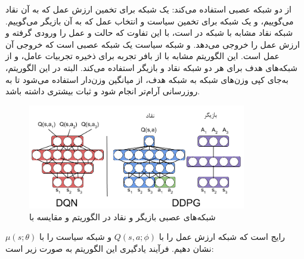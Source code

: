 از دو شبکه عصبی استفاده می‌کند: یک شبکه برای تخمین ارزش عمل که به آن نقاد می‌گوییم، و یک شبکه برای تخمین سیاست و انتخاب عمل که به آن بازیگر می‌گوییم.
شبکه نقاد مشابه با شبکه
  در 
   است، با این تفاوت که حالت و عمل را ورودی گرفته و ارزش عمل را خروجی می‌دهد.
 و شبکه سیاست یک شبکه عصبی است که خروجی آن عمل است.
 این الگوریتم مشابه با 
 از بافر تجربه برای ذخیره تجربیات عامل، و از شبکه‌های هدف برای هر دو شبکه نقاد و بازیگر استفاده می‌کند.
 البته در این الگوریتم، به‌جای کپی وزن‌های شبکه به شبکه هدف، از میانگین وزن‌دار استفاده می‌شود تا به روز‌رسانی آرام‌تر انجام شود و ثبات بیشتری داشته باشد.
 \begin{figure}[H]
    \centering
    \includegraphics[width=0.85\textwidth]{images/actor_critic.png}
    \caption{شبکه‌های عصبی بازیگر و نقاد در الگوریتم  و مقایسه با }\label{fig:actor_critic}
\end{figure}
رایج است که شبکه ارزش عمل را با $Q(s, a; \phi)$ و شبکه سیاست را با $\mu(s; \theta)$ نشان دهیم.
فرآیند یادگیری این الگوریتم به صورت زیر است:
